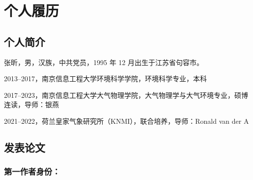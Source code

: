 
\cleardoublepage
{}
{}

\chapter*{个人履历}

\specialsectioning
\section{个人简介}

张昕，男，汉族，中共党员，1995 年 12 月出生于江苏省句容市。

2013--2017，南京信息工程大学环境科学学院，环境科学专业，本科

2017--2023，南京信息工程大学大气物理学院，大气物理学与大气环境专业，硕博连读，导师：银燕

2021--2022，荷兰皇家气象研究所（KNMI），联合培养，导师：Ronald van der A

\specialsectioning
\section{发表论文}

\subsection*{第一作者身份：}

